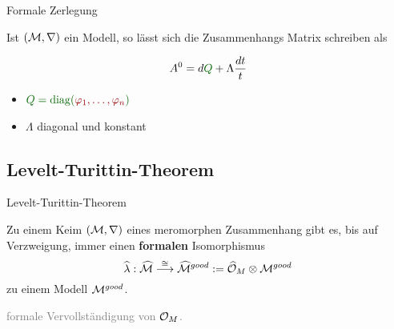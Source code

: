 \begin{frame}[t]{Formale Zerlegung}
  \begin{lem}
    Ist $(\mathcal{M},\nabla)$ ein Modell, so lässt sich die Zusammenhangs Matrix
    schreiben als
    \begin{multicols}{2}
      \[
        A^0=d\overset{~\tikzmark{e1}}{\textcolor{green!40!black}{Q}}
           +~\tikzmark{e2}\!\!\Lambda\frac{dt}{t}
      \]
      \columnbreak
      \begin{itemize}
        \item[\tikzmarkb{n1}{green}]
          $\textcolor{green!40!black}{Q
            =\diag(\textcolor{red!60!black}{\phi_1,\dots,\phi_n})}$
        \item[\tikzmarkc{n2}{blue}]
          $\Lambda$ diagonal und konstant
      \end{itemize}
    \end{multicols}
  \end{lem}
  \vfill
  \vfill
\end{frame}
\subsection{Levelt-Turittin-Theorem}
\begin{frame}{Levelt-Turittin-Theorem}
  \begin{tthm}
    Zu einem Keim $(\mathcal{M},\nabla)$ eines meromorphen Zusammenhang gibt es, bis
    auf Verzweigung, immer einen \textbf{formalen} Isomorphismus
    \[
      \hat\lambda:\hat\cM
      \overset{\cong}\longrightarrow
      \hat\cM^{good}:=~\tikzmark{e1}\!\!\hat\cO_M\otimes\cM^{good}
    \]
    zu einem Modell $\mathcal{M}^{good}$.
  \end{tthm}
  \begin{flushright}
    \textcolor{gray}{formale Vervollständigung von $\mathcal{O}_M$.}
  \end{flushright}
\end{frame}

